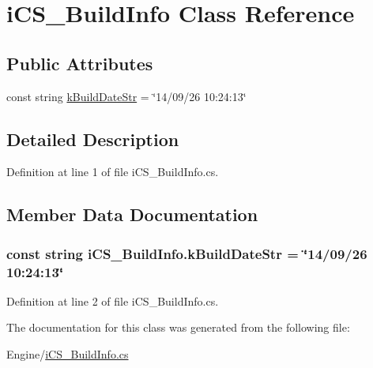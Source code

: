 \hypertarget{classi_c_s___build_info}{\section{i\+C\+S\+\_\+\+Build\+Info Class Reference}
\label{classi_c_s___build_info}
}
\subsection*{Public Attributes}
\begin{DoxyCompactItemize}
\item 
const string \hyperlink{classi_c_s___build_info_aa443199b51fef581e9e88bba1dd732b8}{k\+Build\+Date\+Str} = \char`\"{}14/09/26 10\+:24\+:13\char`\"{}
\end{DoxyCompactItemize}


\subsection{Detailed Description}


Definition at line 1 of file i\+C\+S\+\_\+\+Build\+Info.\+cs.



\subsection{Member Data Documentation}
\hypertarget{classi_c_s___build_info_aa443199b51fef581e9e88bba1dd732b8}{
\subsubsection[{k\+Build\+Date\+Str}]{\setlength{\rightskip}{0pt plus 5cm}const string i\+C\+S\+\_\+\+Build\+Info.\+k\+Build\+Date\+Str = \char`\"{}14/09/26 10\+:24\+:13\char`\"{}}}\label{classi_c_s___build_info_aa443199b51fef581e9e88bba1dd732b8}


Definition at line 2 of file i\+C\+S\+\_\+\+Build\+Info.\+cs.



The documentation for this class was generated from the following file\+:\begin{DoxyCompactItemize}
\item 
Engine/\hyperlink{i_c_s___build_info_8cs}{i\+C\+S\+\_\+\+Build\+Info.\+cs}\end{DoxyCompactItemize}
